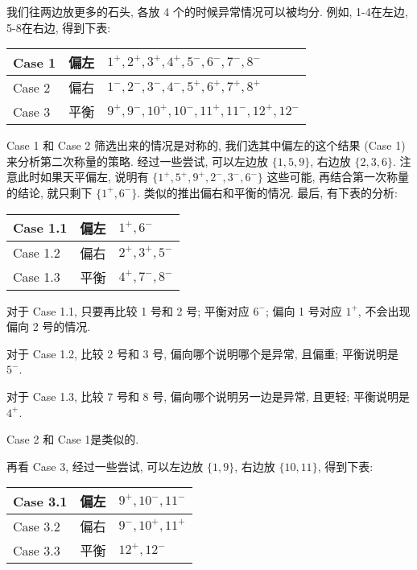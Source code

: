 我们往两边放更多的石头, 各放 4 个的时候异常情况可以被均分. 例如, 1-4在左边, 5-8在右边, 得到下表:
\begin{figure*}[htbp]
\centering
\setlength\extrarowheight{2pt}
\begin{tabular}{l|l|l}
\hline
Case 1 & 偏左  & $1^+, 2^+, 3^+, 4^+, 5^-, 6^-, 7^-, 8^- $ \\ \hline
Case 2 & 偏右  & $1^-, 2^-, 3^-, 4^-, 5^+, 6^+, 7^+, 8^+ $ \\ \hline
Case 3 & 平衡  & $9^+, 9^-, 10^+, 10^-, 11^+, 11^-, 12^+, 12^- $ \\ \hline
\end{tabular}
\end{figure*}

Case 1 和 Case 2 筛选出来的情况是对称的, 我们选其中偏左的这个结果 (Case 1) 来分析第二次称量的策略. 经过一些尝试, 可以左边放 $\{1,5,9\}$, 右边放 $\{2,3,6\}$. 注意此时如果天平偏左, 说明有 $ \{ 1^+, 5^+, 9^+, 2^-, 3^-, 6^- \}$ 这些可能, 再结合第一次称量的结论, 就只剩下 $ \{1^+, 6^- \} $. 类似的推出偏右和平衡的情况. 最后, 有下表的分析:
\begin{figure*}[htbp]
\centering
\setlength\extrarowheight{2pt}
\begin{tabular}{l|l|l}
\hline
Case 1.1 & 偏左  & $1^+, 6^-$ \\ \hline
Case 1.2 & 偏右  & $2^+, 3^+, 5^- $ \\ \hline
Case 1.3 & 平衡  & $4^+, 7^-, 8^- $ \\ \hline
\end{tabular}
\end{figure*}

对于 Case 1.1, 只要再比较 1 号和 2 号; 平衡对应 $ 6^- $; 偏向 1 号对应 $ 1^+ $, 不会出现偏向 2 号的情况. 

对于 Case 1.2, 比较 2 号和 3 号, 偏向哪个说明哪个是异常, 且偏重; 平衡说明是 $ 5^- $. 

对于 Case 1.3, 比较 7 号和 8 号, 偏向哪个说明另一边是异常, 且更轻; 平衡说明是 $ 4^+ $.

Case 2 和 Case 1是类似的. 

再看 Case 3, 经过一些尝试, 可以左边放 $ \{ 1,9 \} $, 右边放 $ \{ 10, 11 \} $, 得到下表:
\begin{figure*}[htbp]
\centering
\setlength\extrarowheight{2pt}
\begin{tabular}{l|l|l}
\hline
Case 3.1 & 偏左  & $9^+, 10^-, 11^-$ \\ \hline
Case 3.2 & 偏右  & $9^-, 10^+, 11^+ $ \\ \hline
Case 3.3 & 平衡  & $12^+, 12^- $ \\ \hline
\end{tabular}
\end{figure*}


